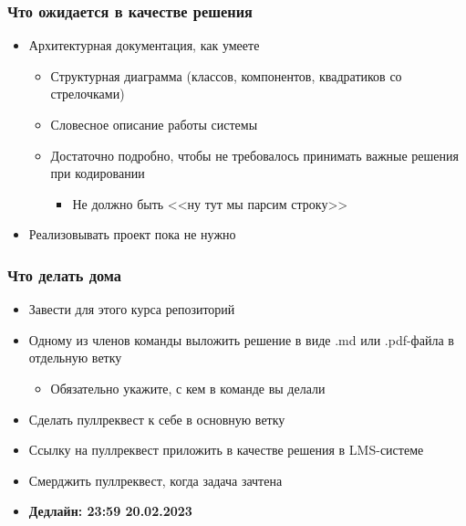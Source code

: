 \documentclass{../../slides-style}
\begin{document}
    \begin{frame}
        \frametitle{Что ожидается в качестве решения}
        \begin{itemize}
            \item Архитектурная документация, как умеете
            \begin{itemize}
                \item Структурная диаграмма (классов, компонентов, квадратиков со стрелочками)
                \item Словесное описание работы системы
                \item Достаточно подробно, чтобы не требовалось принимать важные решения при кодировании
                \begin{itemize}
                    \item Не должно быть <<ну тут мы парсим строку>>
                \end{itemize}
            \end{itemize}
            \item Реализовывать проект пока не нужно
        \end{itemize}
    \end{frame}

    \begin{frame}
        \frametitle{Что делать дома}
        \begin{itemize}
            \item Завести для этого курса репозиторий
            \item Одному из членов команды выложить решение в виде .md или .pdf-файла в отдельную ветку
            \begin{itemize}
                \item Обязательно укажите, с кем в команде вы делали
            \end{itemize}
            \item Сделать пуллреквест к себе в основную ветку
            \item Ссылку на пуллреквест приложить в качестве решения в LMS-системе
            \item Смерджить пуллреквест, когда задача зачтена
            \item \textbf{Дедлайн: 23:59 20.02.2023}
        \end{itemize}
    \end{frame}
\end{document}
